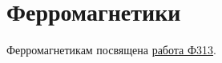 \chapter{Ферромагнетики}

	Ферромагнетикам посвящена \href{http://dl.dropbox.com/u/41185505/University/Physics/Electricity/%D0%A4313.pdf}{работа Ф313}.

